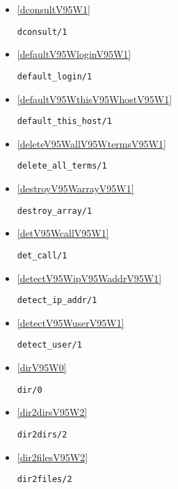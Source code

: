 \begin{itemize}
\item \ref{dconsultV95W1} 
\begin{verbatim}
dconsult/1
\end{verbatim}

\item \ref{defaultV95WloginV95W1} 
\begin{verbatim}
default_login/1
\end{verbatim}

\item \ref{defaultV95WthisV95WhostV95W1} 
\begin{verbatim}
default_this_host/1
\end{verbatim}

\item \ref{deleteV95WallV95WtermsV95W1} 
\begin{verbatim}
delete_all_terms/1
\end{verbatim}

\item \ref{destroyV95WarrayV95W1} 
\begin{verbatim}
destroy_array/1
\end{verbatim}

\item \ref{detV95WcallV95W1} 
\begin{verbatim}
det_call/1
\end{verbatim}

\item \ref{detectV95WipV95WaddrV95W1} 
\begin{verbatim}
detect_ip_addr/1
\end{verbatim}

\item \ref{detectV95WuserV95W1} 
\begin{verbatim}
detect_user/1
\end{verbatim}

\item \ref{dirV95W0} 
\begin{verbatim}
dir/0
\end{verbatim}

\item \ref{dir2dirsV95W2} 
\begin{verbatim}
dir2dirs/2
\end{verbatim}

\item \ref{dir2filesV95W2} 
\begin{verbatim}
dir2files/2
\end{verbatim}


\end{itemize}
